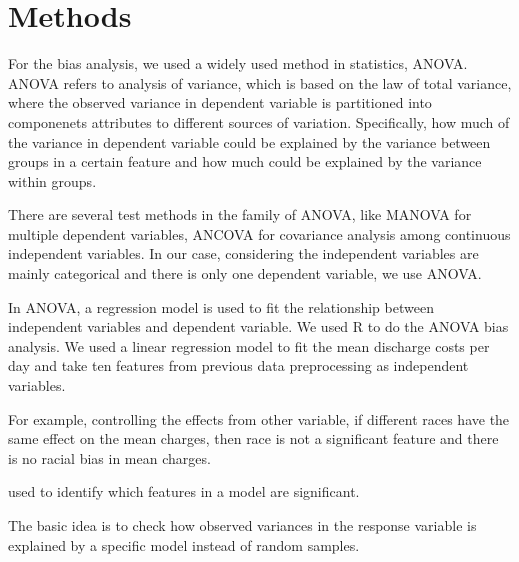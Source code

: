 \documentclass[10pt,twocolumn,letterpaper]{article}
\begin{document}


\section{Methods}

For the bias analysis, we used a widely used method in statistics, ANOVA. ANOVA refers to analysis of variance, which is based on the law of total variance, where the observed variance in dependent variable is partitioned into componenets attributes to different sources of variation. Specifically, how much of the variance in dependent variable could be explained by the variance between groups in a certain feature and how much could be explained by the variance within groups. 


There are several test methods in the family of ANOVA, like MANOVA for multiple dependent variables, ANCOVA for covariance analysis among continuous independent variables. In our case, considering the independent variables are mainly categorical and there is only one dependent variable, we use ANOVA. 

In ANOVA, a regression model is used to fit the relationship between independent variables and dependent variable. We used R to do the ANOVA bias analysis. We used a linear regression model to fit the mean discharge costs per day and take ten features from previous data preprocessing as independent variables. 

For example, controlling the effects from other variable, if different races have the same effect on the mean charges, then race is not a significant feature and there is no racial bias in mean charges. 

used to identify which features in a model are significant. 

The basic idea is to check how observed variances in the response variable is explained by a specific model instead of random samples. %
\end{document}
